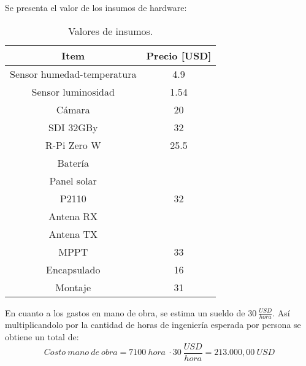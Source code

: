 Se presenta el valor de los insumos de hardware:
\begin{table}[H]
\centering
\begin{tabular}{|c|c|}
\hline
\textbf{Item}                                                         & \textbf{Precio [USD]}				  \\ \hline
Sensor humedad-temperatura 											  & 4.9                                   \\ \hline
Sensor luminosidad                                                    & 1.54                                  \\ \hline
Cámara                                                                & 20                                    \\ \hline
SDI 32GBy                                                             & 32                                    \\ \hline
R-Pi Zero W                                                           & 25.5                                  \\ \hline
Batería                                                               & \TBD                   				  \\ \hline
Panel solar                                                           & \TBD                   				  \\ \hline
P2110                                                                 & 32                                    \\ \hline
Antena RX                                                             & \TBD                   				  \\ \hline
Antena TX                                                             & \TBD                   				  \\ \hline
MPPT                                                                  & 33                                    \\ \hline
Encapsulado                                                           & 16                                    \\ \hline
Montaje                                                               & 31                                    \\ \hline
\end{tabular}
\caption{Valores de insumos.}
\end{table}


En cuanto a los gastos en mano de obra, se estima un sueldo de $30 \ \frac{USD}{hora}$. Así multiplicandolo por la cantidad de horas de ingeniería esperada por persona se obtiene un total de: $$Costo \ mano \ de \ obra = 7100 \ hora \ \cdot 30 \ \frac{USD}{hora} = 213.000,00 \ USD$$

